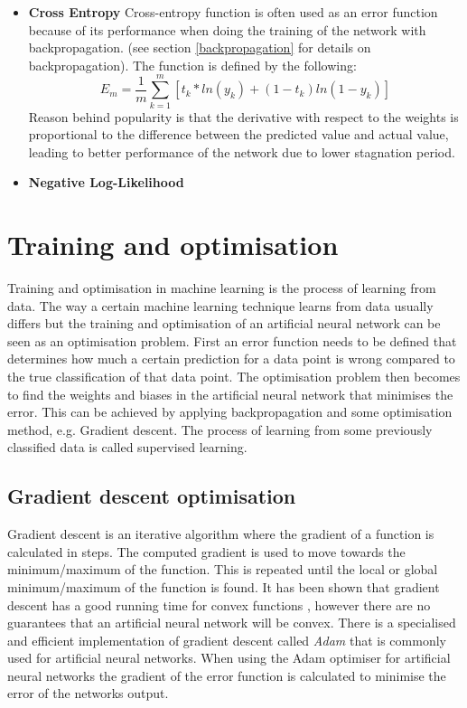 \begin{itemize}
    \item \textbf{Cross Entropy}
    Cross-entropy function is often used as an error function because of its performance when doing the training of the network with backpropagation. (see section \ref{backpropagation} for details on backpropagation). The function is defined by the following:\\
    \begin{equation} \label{eq:crossentropy}
        E_m = \frac{1}{m}\sum_{k=1}^{m} [t_k * ln(y_k) +(1-t_k)ln(1-y_k) ]
    \end{equation}
    Reason behind popularity is that the derivative with respect to the weights is proportional to the difference between the predicted value and actual value, leading to better performance of the network due to lower stagnation period.    \parencite{nasr2002cross}
    
    \item \textbf{Negative Log-Likelihood}
\end{itemize}

\section{Training and optimisation} \label{trainingoptimisation}
Training and optimisation in machine learning is the process of learning from data. The way a certain machine learning technique learns from data usually differs but the training and optimisation of an artificial neural network can be seen as an optimisation problem. First an error function needs to be defined that determines how much a certain prediction for a data point is wrong compared to the true classification of that data point. The optimisation problem then becomes to find the weights and biases in the artificial neural network that minimises the error. This can be achieved by applying backpropagation and some optimisation method, e.g. Gradient descent. The process of learning from some previously classified data is called supervised learning.

\subsection{Gradient descent optimisation}
Gradient descent is an iterative algorithm where the gradient of a function is calculated in steps. The computed gradient is used to move towards the minimum/maximum of the function. This is repeated until the local or global minimum/maximum of the function is found. It has been shown that gradient descent has a good running time for convex functions \parencite{convexSGD}, however there are no guarantees that an artificial neural network will be convex. There is a specialised and efficient implementation of gradient descent called \textit{Adam} \parencite{adamoptimizer} that is commonly used for artificial neural networks. When using the Adam optimiser for artificial neural networks the gradient of the error function is calculated to minimise the error of the networks output.

